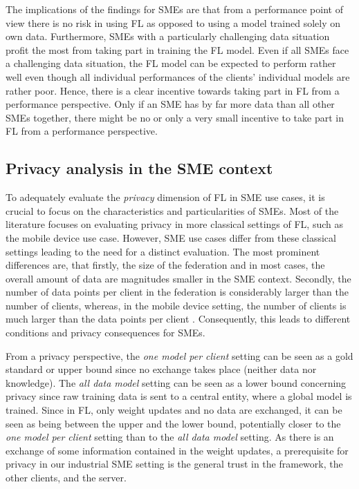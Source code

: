 The implications of the findings for SMEs are that from a performance point of view there is no risk in using FL as opposed to using a model trained solely on own data. Furthermore, SMEs with a particularly challenging data situation profit the most from taking part in training the FL model. Even if all SMEs face a challenging data situation, the FL model can be expected to perform rather well even though all individual performances of the clients' individual models are rather poor. Hence, there is a clear incentive towards taking part in FL from a performance perspective. Only if an SME has by far more data than all other SMEs together, there might be no or only a very small incentive to take part in FL from a performance perspective.

\subsection{Privacy analysis in the SME context\label{sec:privacy_analysis}}
To adequately evaluate the \emph{privacy} dimension of FL in SME use cases, it is crucial to focus on the characteristics and particularities of SMEs. Most of the literature focuses on evaluating privacy in more classical settings of FL, such as the mobile device use case. However, SME use cases differ from these classical settings leading to the need for a distinct evaluation. The most prominent differences are, that firstly, the size of the federation and in most cases, the overall amount of data are magnitudes smaller in the SME context. Secondly, the number of data points per client in the federation is considerably larger than the number of clients, whereas, in the mobile device setting, the number of clients is much larger than the data points per client \citep{mcmahan2017communication}. Consequently, this leads to different conditions and privacy consequences for SMEs.

From a privacy perspective, the \emph{one model per client} setting can be seen as a gold standard or upper bound since no exchange takes place (neither data nor knowledge). The \emph{all data model} setting can be seen as a lower bound concerning privacy since raw training data is sent to a central entity, where a global model is trained. Since in FL, only weight updates and no data are exchanged, it can be seen as being between the upper and the lower bound, potentially closer to the \emph{one model per client} setting than to the \emph{all data model} setting. As there is an exchange of some information contained in the weight updates, a prerequisite for privacy in our industrial SME setting is the general trust in the framework, the other clients, and the server.

